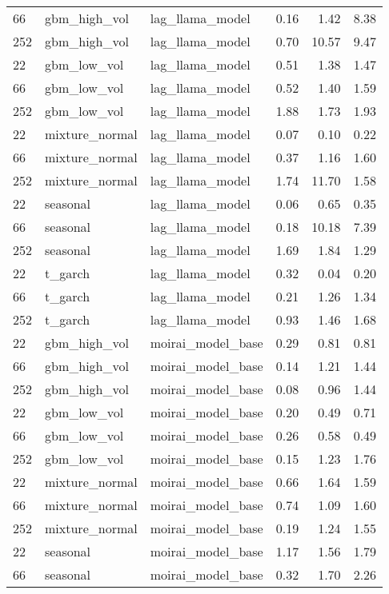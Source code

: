 {\begin{tabular}{lllrrr}
66 & gbm\_high\_vol & lag\_llama\_model & 0.16 & 1.42 & 8.38 \\
252 & gbm\_high\_vol & lag\_llama\_model & 0.70 & 10.57 & 9.47 \\
\midrule
22 & gbm\_low\_vol & lag\_llama\_model & 0.51 & 1.38 & 1.47 \\
66 & gbm\_low\_vol & lag\_llama\_model & 0.52 & 1.40 & 1.59 \\
252 & gbm\_low\_vol & lag\_llama\_model & 1.88 & 1.73 & 1.93 \\
\midrule
22 & mixture\_normal & lag\_llama\_model & 0.07 & 0.10 & 0.22 \\
66 & mixture\_normal & lag\_llama\_model & 0.37 & 1.16 & 1.60 \\
252 & mixture\_normal & lag\_llama\_model & 1.74 & 11.70 & 1.58 \\
\midrule
22 & seasonal & lag\_llama\_model & 0.06 & 0.65 & 0.35 \\
66 & seasonal & lag\_llama\_model & 0.18 & 10.18 & 7.39 \\
252 & seasonal & lag\_llama\_model & 1.69 & 1.84 & 1.29 \\
\midrule
22 & t\_garch & lag\_llama\_model & 0.32 & 0.04 & 0.20 \\
66 & t\_garch & lag\_llama\_model & 0.21 & 1.26 & 1.34 \\
252 & t\_garch & lag\_llama\_model & 0.93 & 1.46 & 1.68 \\
\midrule
22 & gbm\_high\_vol & moirai\_model\_base & 0.29 & 0.81 & 0.81 \\
66 & gbm\_high\_vol & moirai\_model\_base & 0.14 & 1.21 & 1.44 \\
252 & gbm\_high\_vol & moirai\_model\_base & 0.08 & 0.96 & 1.44 \\
\midrule
22 & gbm\_low\_vol & moirai\_model\_base & 0.20 & 0.49 & 0.71 \\
66 & gbm\_low\_vol & moirai\_model\_base & 0.26 & 0.58 & 0.49 \\
252 & gbm\_low\_vol & moirai\_model\_base & 0.15 & 1.23 & 1.76 \\
\midrule
22 & mixture\_normal & moirai\_model\_base & 0.66 & 1.64 & 1.59 \\
66 & mixture\_normal & moirai\_model\_base & 0.74 & 1.09 & 1.60 \\
252 & mixture\_normal & moirai\_model\_base & 0.19 & 1.24 & 1.55 \\
\midrule
22 & seasonal & moirai\_model\_base & 1.17 & 1.56 & 1.79 \\
66 & seasonal & moirai\_model\_base & 0.32 & 1.70 & 2.26 \\

\end{tabular}}
